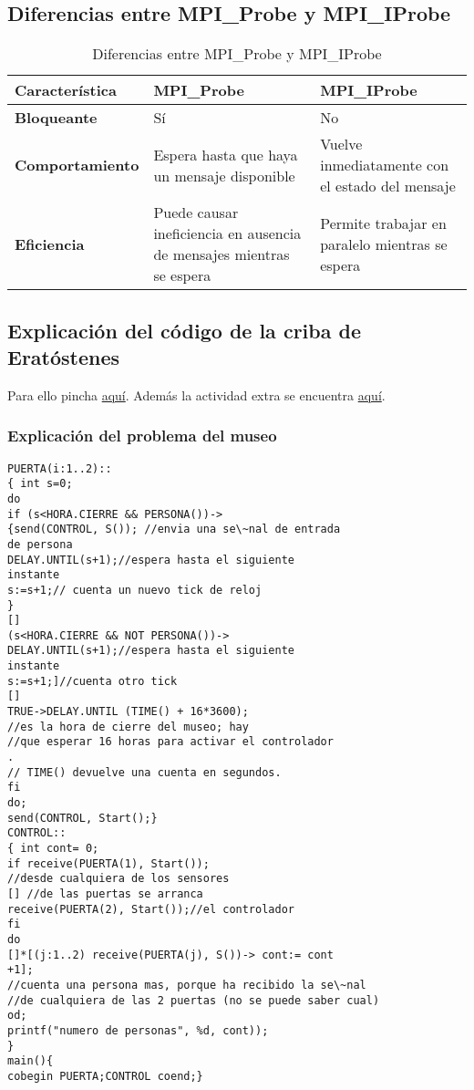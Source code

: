 \documentclass[a4paper,12pt]{article}
\begin{document}
\subsection*{Diferencias entre MPI\_Probe y MPI\_IProbe}

\begin{table}[ht]
\centering
\begin{tabular}{|p{5cm}|p{5cm}|p{5cm}|}
\hline
\textbf{Característica}        & \textbf{MPI\_Probe} & \textbf{MPI\_IProbe}  \\ \hline
\textbf{Bloqueante}           & Sí & No  \\ \hline
\textbf{Comportamiento}       & Espera hasta que haya un mensaje disponible & Vuelve inmediatamente con el estado del mensaje  \\ \hline
\textbf{Eficiencia}           & Puede causar ineficiencia en ausencia de mensajes mientras se espera & Permite trabajar en paralelo mientras se espera  \\ \hline
\end{tabular}
\caption{Diferencias entre MPI\_Probe y MPI\_IProbe}
\end{table}

\subsection{Explicación del código de la criba de Eratóstenes}

Para ello pincha \href{https://github.com/ElblogdeIsmael/ElblogdeIsmael.github.io/blob/main/Asignaturas/Tercer%20A%C3%B1o/SCD/Resumenes/ETSIIT/cribaExplicacion.md}{aquí}. Además la actividad extra se encuentra \href{https://github.com/ElblogdeIsmael/ElblogdeIsmael.github.io/blob/main/Asignaturas/Tercer%20A%C3%B1o/SCD/Teoria/Actividad_Extra/cribadeErastotenes/ETSIIT/build/Erastotenes.pdf}{aquí}.


\subsubsection{Explicación del problema del museo}

\begin{lstlisting}[style = customcpp]
    PUERTA(i:1..2)::
{ int s=0;
do
if (s<HORA.CIERRE && PERSONA())->
{send(CONTROL, S()); //envia una se\~nal de entrada
de persona
DELAY.UNTIL(s+1);//espera hasta el siguiente
instante
s:=s+1;// cuenta un nuevo tick de reloj
}
[]
(s<HORA.CIERRE && NOT PERSONA())->
DELAY.UNTIL(s+1);//espera hasta el siguiente
instante
s:=s+1;]//cuenta otro tick
[]
TRUE->DELAY.UNTIL (TIME() + 16*3600);
//es la hora de cierre del museo; hay
//que esperar 16 horas para activar el controlador
.
// TIME() devuelve una cuenta en segundos.
fi
do;
send(CONTROL, Start();}
CONTROL::
{ int cont= 0;
if receive(PUERTA(1), Start());
//desde cualquiera de los sensores
[] //de las puertas se arranca
receive(PUERTA(2), Start());//el controlador
fi
do
[]*[(j:1..2) receive(PUERTA(j), S())-> cont:= cont
+1];
//cuenta una persona mas, porque ha recibido la se\~nal
//de cualquiera de las 2 puertas (no se puede saber cual)
od;
printf("numero de personas", %d, cont));
}
main(){
cobegin PUERTA;CONTROL coend;}
\end{lstlisting}
\end{document}
